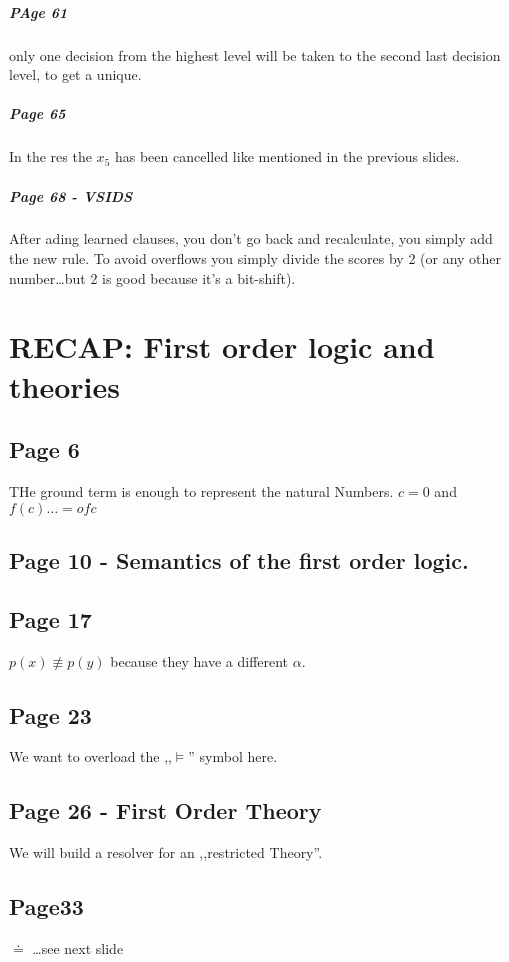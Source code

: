 \documentclass[a4paper]{article}
\newcommand{\entails}[1]{\models{#1}}
\begin{document}
\subparagraph{PAge 61}

only one decision from the highest level will be taken to the second last
decision level, to get a unique.

\subparagraph{Page 65}
In the res the $x_5$ has been cancelled like mentioned in the previous slides.

\subparagraph{Page 68 - VSIDS}
After ading learned clauses, you don't go back and recalculate, you simply add
the new rule. To avoid overflows you simply divide the scores by 2 (or any
other number\ldots but 2 is good because it's a bit-shift).




\section{RECAP: First order logic and theories}

\subsection{Page 6}
THe ground term is enough to represent the natural Numbers. $c = 0$ and $f(c)
\ldots = of c$

\subsection{Page 10 - Semantics of the first order logic.}

\subsection{Page 17}
$p(x) \not\equiv p(y)$ because they have a different $\alpha$.

\subsection{Page 23}
We want to overload the ,,$\entails{}$'' symbol here.


\subsection{Page 26 - First Order Theory}

We will build a resolver for an ,,restricted Theory''.

\subsection{Page33}
$\doteq$ \ldots see next slide
\end{document}
